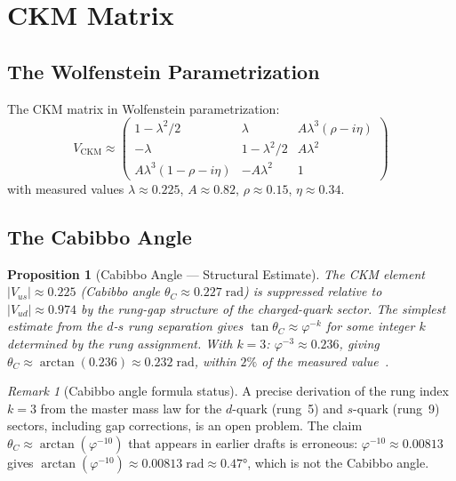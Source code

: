 \documentclass[12pt,a4paper]{article}
\newtheorem{proposition}[theorem]{Proposition}
\theoremstyle{definition}
\theoremstyle{remark}
\newtheorem{remark}[theorem]{Remark}
\begin{document}
\section{CKM Matrix}
\label{sec:ckm}

\subsection{The Wolfenstein Parametrization}

The CKM matrix in Wolfenstein parametrization:
\begin{equation}
V_{\mathrm{CKM}} \approx \begin{pmatrix}
1 - \lambda^2/2 & \lambda & A\lambda^3(\rho - i\eta) \\
-\lambda & 1 - \lambda^2/2 & A\lambda^2 \\
A\lambda^3(1 - \rho - i\eta) & -A\lambda^2 & 1
\end{pmatrix}
\end{equation}
with measured values $\lambda \approx 0.225$, $A \approx 0.82$,
$\rho \approx 0.15$, $\eta \approx 0.34$.

\subsection{The Cabibbo Angle}

\begin{proposition}[Cabibbo Angle --- Structural Estimate]
\label{prop:cabibbo}
The CKM element $|V_{us}| \approx 0.225$ (Cabibbo angle
$\theta_C \approx 0.227\;\mathrm{rad}$) is suppressed relative to
$|V_{ud}| \approx 0.974$ by the rung-gap structure of the charged-quark
sector.  The simplest estimate from the $d$-$s$ rung separation gives
$\tan\theta_C \approx \varphi^{-k}$ for some integer $k$ determined
by the rung assignment.  With $k = 3$: $\varphi^{-3} \approx 0.236$,
giving $\theta_C \approx \arctan(0.236) \approx 0.232\;\mathrm{rad}$,
within $2\%$ of the measured value~\cite{PDG2024}.
\end{proposition}

\begin{remark}[Cabibbo angle formula status]
A precise derivation of the rung index $k = 3$ from the master mass
law for the $d$-quark (rung~5) and $s$-quark (rung~9) sectors,
including gap corrections, is an open problem.  The claim
$\theta_C \approx \arctan(\varphi^{-10})$ that appears in earlier
drafts is erroneous: $\varphi^{-10} \approx 0.00813$ gives
$\arctan(\varphi^{-10}) \approx 0.00813\;\mathrm{rad} \approx 0.47°$,
which is not the Cabibbo angle.
\end{remark}
\end{document}
